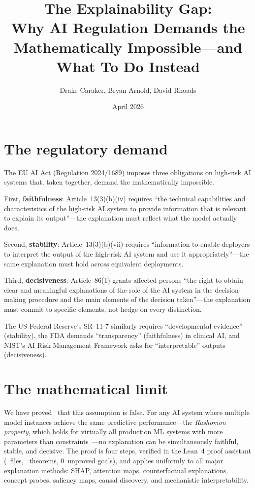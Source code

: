 \documentclass[11pt]{article}
\title{The Explainability Gap:\\
  Why AI Regulation Demands the Mathematically Impossible---and What To Do Instead}
\author{Drake Caraker, Bryan Arnold, David Rhoads}
\date{April 2026}
\begin{document}
\maketitle


\section*{The regulatory demand}

The EU AI Act (Regulation 2024/1689) imposes three obligations on high-risk
AI systems that, taken together, demand the mathematically impossible.

First, \textbf{faithfulness}: Article~13(3)(b)(iv) requires ``the technical
capabilities and characteristics of the high-risk AI system to provide
information that is relevant to explain its output''---the explanation must
reflect what the model actually does.

Second, \textbf{stability}: Article~13(3)(b)(vii) requires ``information to
enable deployers to interpret the output of the high-risk AI system and use
it appropriately''---the same explanation must hold across equivalent
deployments.

Third, \textbf{decisiveness}: Article~86(1) grants affected persons ``the
right to obtain clear and meaningful explanations of the role of the AI
system in the decision-making procedure and the main elements of the
decision taken''---the explanation must commit to specific elements, not
hedge on every distinction.

The US Federal Reserve's SR~11-7 similarly requires ``developmental evidence''
(stability), the FDA demands ``transparency'' (faithfulness) in clinical AI,
and NIST's AI Risk Management Framework asks for ``interpretable'' outputs
(decisiveness).

\section*{The mathematical limit}

We have proved~\citep{caraker2026universal} that this assumption is false.
For any AI system where multiple model instances achieve the same predictive
performance---the \emph{Rashomon property}, which holds for virtually all
production ML systems with more parameters than
constraints~\citep{breiman2001statistical,rudin2024amazing}---no explanation
can be simultaneously faithful, stable, and decisive.  The proof is four
steps, verified in the Lean~4 proof assistant (\ClaimMainFiles~files, \ClaimMainTheorems~theorems,
0~unproved goals), and applies uniformly to all major explanation methods:
SHAP, attention maps, counterfactual explanations, concept probes, saliency
maps, causal discovery, and mechanistic interpretability.
\end{document}
